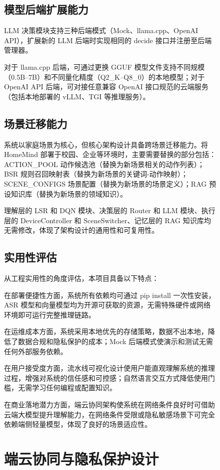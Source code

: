 \documentclass[12pt,a4paper,oneside]{ctexrep}
\begin{document}
\begin{figure}[H]
\section{模型后端扩展能力}

LLM 决策模块支持三种后端模式（Mock、llama.cpp、OpenAI API），扩展新的 LLM 后端时实现相同的 decide 接口并注册至后端管理器。

对于 llama.cpp 后端，可通过更换 GGUF 模型文件支持不同规模（0.5B--7B）和不同量化精度（Q2\_K--Q8\_0）的本地模型；对于 OpenAI API 后端，可对接任意兼容 OpenAI 接口规范的云端服务（包括本地部署的 vLLM、TGI 等推理服务）。

\section{场景迁移能力}

系统以家庭场景为核心，但核心架构设计具备跨场景迁移能力。将 HomeMind 部署于校园、企业等环境时，主要需要替换的部分包括：ACTION\_POOL 动作候选池（替换为新场景相关的动作列表）；BSR 规则召回映射表（替换为新场景的关键词-动作映射）；SCENE\_CONFIGS 场景配置（替换为新场景的场景定义）；RAG 预设知识库（替换为新场景的领域知识）。

理解层的 LSR 和 DQN 模块、决策层的 Router 和 LLM 模块、执行层的 DeviceController 和 SceneSwitcher、记忆层的 RAG 知识库均无需修改，体现了架构设计的通用性和可复用性。

\section{实用性评估}

从工程实用性的角度评估，本项目具备以下特点：

在部署便捷性方面，系统所有依赖均可通过 pip install 一次性安装，ASR 模型和向量模型均为开源可获取的资源，无需特殊硬件或网络环境即可运行完整推理链路。

在运维成本方面，系统采用本地优先的存储策略，数据不出本地，降低了数据合规和隐私保护的成本；Mock 后端模式使演示和测试无需任何外部服务依赖。

在用户接受度方面，流水线可视化设计使用户能直观理解系统的推理过程，增强对系统的信任感和可控感；自然语言交互方式降低使用门槛，无需学习任何编程或配置知识。

在商业落地潜力方面，端云协同架构使系统在网络条件良好时可借助云端大模型提升理解能力，在网络条件受限或隐私敏感场景下可完全依赖端侧轻量模型，体现了良好的场景适应性。

\chapter{端云协同与隐私保护设计}


\end{figure}
\end{document}
